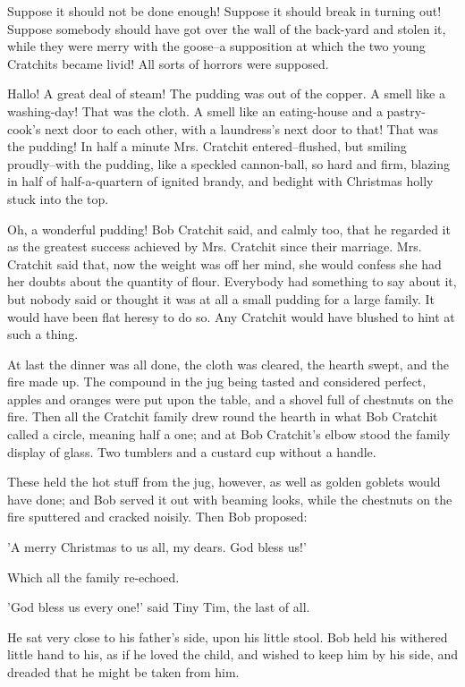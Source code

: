 Suppose it should not be done enough! Suppose it should break in turning
out! Suppose somebody should have got over the wall of the back-yard and
stolen it, while they were merry with the goose--a supposition at which
the two young Cratchits became livid! All sorts of horrors were
supposed.

Hallo! A great deal of steam! The pudding was out of the copper. A smell
like a washing-day! That was the cloth. A smell like an eating-house and
a pastry-cook's next door to each other, with a laundress's next door to
that! That was the pudding! In half a minute Mrs. Cratchit
entered--flushed, but smiling proudly--with the pudding, like a speckled
cannon-ball, so hard and firm, blazing in half of half-a-quartern of
ignited brandy, and bedight with Christmas holly stuck into the top.

Oh, a wonderful pudding! Bob Cratchit said, and calmly too, that he
regarded it as the greatest success achieved by Mrs. Cratchit since
their marriage. Mrs. Cratchit said that, now the weight was off her
mind, she would confess she had her doubts about the quantity of flour.
Everybody had something to say about it, but nobody said or thought it
was at all a small pudding for a large family. It would have been flat
heresy to do so. Any Cratchit would have blushed to hint at such a
thing.

At last the dinner was all done, the cloth was cleared, the hearth
swept, and the fire made up. The compound in the jug being tasted and
considered perfect, apples and oranges were put upon the table, and a
shovel full of chestnuts on the fire. Then all the Cratchit family
drew round the hearth in what Bob Cratchit called a circle, meaning half
a one; and at Bob Cratchit's elbow stood the family display of glass.
Two tumblers and a custard cup without a handle.

These held the hot stuff from the jug, however, as well as golden
goblets would have done; and Bob served it out with beaming looks, while
the chestnuts on the fire sputtered and cracked noisily. Then Bob
proposed:

'A merry Christmas to us all, my dears. God bless us!'

Which all the family re-echoed.

'God bless us every one!' said Tiny Tim, the last of all.

He sat very close to his father's side, upon his little stool. Bob held
his withered little hand to his, as if he loved the child, and wished to
keep him by his side, and dreaded that he might be taken from him.

